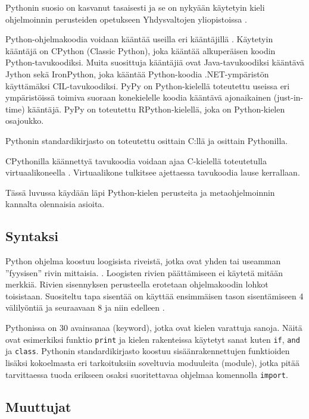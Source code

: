 \documentclass[finnish]{tktltiki2}
\theoremstyle{definition}
\theoremstyle{remark}
\begin{document}
Pythonin suosio on kasvanut tasaisesti ja se on nykyään käytetyin kieli ohjelmoinnin perusteiden opetukseen Yhdysvaltojen yliopistoissa \cite{python-teaching}.

Python-ohjelmakoodia voidaan kääntää useilla eri kääntäjillä \cite{martelli2006python}. Käytetyin kääntäjä on CPython (Classic Python), joka kääntää alkuperäisen koodin Python-tavukoodiksi. Muita suosittuja kääntäjiä ovat Java-tavukoodiksi kääntävä Jython sekä IronPython, joka kääntää Python-koodia .NET-ympäristön käyttämäksi CIL-tavukoodiksi. PyPy on Python-kielellä toteutettu useissa eri ympäristöissä toimiva suoraan konekielelle koodia kääntävä ajonaikainen (just-in-time) kääntäjä. PyPy on toteutettu RPython-kielellä, joka on Python-kielen osajoukko.

Pythonin standardikirjasto on toteutettu osittain C:llä ja osittain Pythonilla.

CPythonilla käännettyä tavukoodia voidaan ajaa C-kielellä toteutetulla virtuaalikoneella \cite{martelli2006python}. Virtuaalikone tulkitsee ajettaessa tavukoodia lause kerrallaan.

Tässä luvussa käydään läpi Python-kielen perusteita ja metaohjelmoinnin kannalta olennaisia asioita.


\subsection{Syntaksi}

Python ohjelma koostuu loogisista riveistä, jotka ovat yhden tai useamman ''fyysisen'' rivin mittaisia. \cite{martelli2006python}. Loogisten rivien päättämiseen ei käytetä mitään merkkiä. Rivien sisennyksen perusteella erotetaan ohjelmakoodin lohkot toisistaan. Suositeltu tapa sisentää on käyttää ensimmäisen tason sisentämiseen 4 välilyöntiä ja seuraavaan 8 ja niin edelleen \cite{pep8}. 

Pythonissa on 30 avainsanaa (keyword), jotka ovat kielen varattuja sanoja. Näitä ovat esimerkiksi funktio \verb|print| ja kielen rakenteissa käytetyt sanat kuten \verb|if|, \verb|and| ja \verb|class|. Pythonin standardikirjasto koostuu sisäänrakennettujen funktioiden lisäksi kokoelmasta eri tarkoituksiin soveltuvia moduuleita (module), jotka pitää tarvittaessa tuoda erikseen osaksi suoritettavaa ohjelmaa komennolla \verb|import|.



\subsection{Muuttujat}
\end{document}
